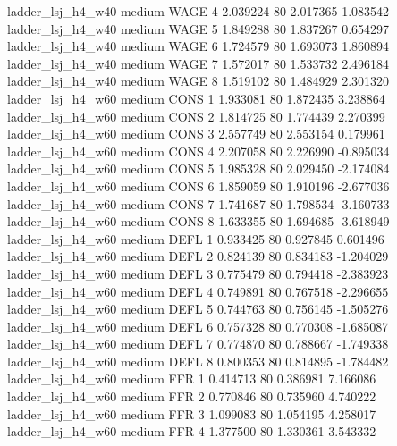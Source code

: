   ladder_lsj_h4_w40     medium     WAGE                 4  2.039224 80       2.017365           1.083542
  ladder_lsj_h4_w40     medium     WAGE                 5  1.849288 80       1.837267           0.654297
  ladder_lsj_h4_w40     medium     WAGE                 6  1.724579 80       1.693073           1.860894
  ladder_lsj_h4_w40     medium     WAGE                 7  1.572017 80       1.533732           2.496184
  ladder_lsj_h4_w40     medium     WAGE                 8  1.519102 80       1.484929           2.301320
  ladder_lsj_h4_w60     medium     CONS                 1  1.933081 80       1.872435           3.238864
  ladder_lsj_h4_w60     medium     CONS                 2  1.814725 80       1.774439           2.270399
  ladder_lsj_h4_w60     medium     CONS                 3  2.557749 80       2.553154           0.179961
  ladder_lsj_h4_w60     medium     CONS                 4  2.207058 80       2.226990          -0.895034
  ladder_lsj_h4_w60     medium     CONS                 5  1.985328 80       2.029450          -2.174084
  ladder_lsj_h4_w60     medium     CONS                 6  1.859059 80       1.910196          -2.677036
  ladder_lsj_h4_w60     medium     CONS                 7  1.741687 80       1.798534          -3.160733
  ladder_lsj_h4_w60     medium     CONS                 8  1.633355 80       1.694685          -3.618949
  ladder_lsj_h4_w60     medium     DEFL                 1  0.933425 80       0.927845           0.601496
  ladder_lsj_h4_w60     medium     DEFL                 2  0.824139 80       0.834183          -1.204029
  ladder_lsj_h4_w60     medium     DEFL                 3  0.775479 80       0.794418          -2.383923
  ladder_lsj_h4_w60     medium     DEFL                 4  0.749891 80       0.767518          -2.296655
  ladder_lsj_h4_w60     medium     DEFL                 5  0.744763 80       0.756145          -1.505276
  ladder_lsj_h4_w60     medium     DEFL                 6  0.757328 80       0.770308          -1.685087
  ladder_lsj_h4_w60     medium     DEFL                 7  0.774870 80       0.788667          -1.749338
  ladder_lsj_h4_w60     medium     DEFL                 8  0.800353 80       0.814895          -1.784482
  ladder_lsj_h4_w60     medium      FFR                 1  0.414713 80       0.386981           7.166086
  ladder_lsj_h4_w60     medium      FFR                 2  0.770846 80       0.735960           4.740222
  ladder_lsj_h4_w60     medium      FFR                 3  1.099083 80       1.054195           4.258017
  ladder_lsj_h4_w60     medium      FFR                 4  1.377500 80       1.330361           3.543332
